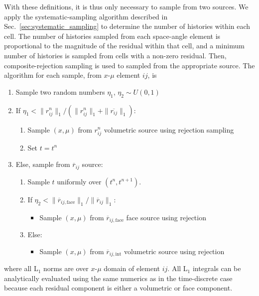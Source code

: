 With these definitions, it is thus only necessary to sample from two sources.  We apply
the systematic-sampling algorithm described in Sec.~\ref{sec:systematic_sampling} to
determine the number of histories within each cell.  The
number of histories sampled from each space-angle element is proportional to the magnitude
of the residual within that cell, and a minimum number of histories is sampled from cells
with a non-zero residual.  Then, composite-rejection sampling is used to sampled from the
appropriate source.  The algorithm for each sample, from $x$-$\mu$ element $ij$, is 
\begin{enumerate}
    \item Sample two random numbers $\eta_1$, $\eta_2\sim U(0,1)$ 
    \item If $\eta_1 < \|r_{ij}^{n}\|_1/(\|r_{ij}^{n}\|_1 + \|\overline{r_{ij}}\|_1)$:
    \begin{enumerate}
        \item Sample $(x,\mu)$ from $r_{ij}^{n}$ volumetric source using rejection sampling
        \item Set $t=t^n$
    \end{enumerate}
\item Else, sample from $\overline r_{ij}$ source:
    \begin{enumerate}
        \item \label{itm:time_step}Sample $t$ uniformly over $(t^{n},t^{n+1})$.
        \item If $\eta_2 < \|\overline{r}_{ij,\text{face}}\|_1/\|\overline{r}_{ij}\|_1$:
            \begin{itemize}
                \item Sample $(x,\mu)$ from $\overline r_{ij,\text{face}}$ face source using rejection
            \end{itemize}
        \item Else:
            \begin{itemize}
                \item Sample $(x,\mu)$ from $\overline r_{ij,\text{int}}$ volumetric source using rejection
            \end{itemize}
    \end{enumerate}
\end{enumerate}
where all L$_1$ norms are over $x$-$\mu$ domain of element $ij$.  All L$_1$ integrals can be analytically
evaluated using the same numerics as in the
time-discrete case because each residual component is either a volumetric or face
component.  

